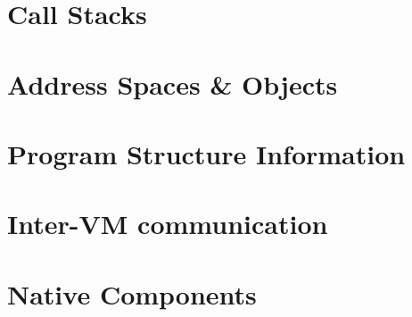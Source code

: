 \section{Call Stacks}

\section{Address Spaces \& Objects}

\section{Program Structure Information}

\section{Inter-VM communication} %

\section{Native Components} %


